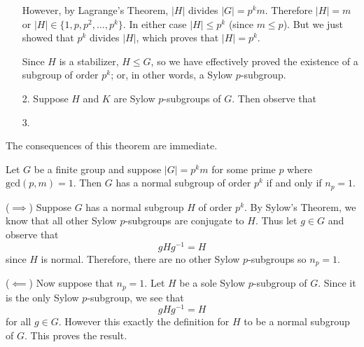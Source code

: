 \documentclass[12pt,letterpaper]{algebra_book}
\theoremstyle{definition}
\begin{document}
\begin{prf}
\begin{itemize}
            However, by Lagrange's Theorem, $|H|$ divides $|G| =
            p^km$. Therefore $|H| = m$ or $|H| \in \{1, p, p^2, \dots,
            p^k\}$. In either case $|H| \le p^k$ (since $m \le p$).
            But we just showed that $p^k$ divides $|H|$, which proves
            that $|H| = p^k$. 
            
            Since $H$ is a stabilizer, $H \le G$, so
            we have effectively proved the existence of a subgroup of
            order $p^k$; or, in other words, a Sylow $p$-subgroup. 

        \item[2.]
            Suppose $H$ and $K$ are Sylow $p$-subgroups of $G$. 
            Then observe that 

        \item[3.] 
            


            
        \end{itemize}
    \end{prf}

    The consequences of this theorem are immediate. 
    \begin{proposition}\label{sylow_normal}
        Let $G$ be a finite group and suppose $|G| = p^km$ for some
        prime $p$ where $\mbox{gcd}(p, m) = 1$. Then $G$ has a normal
        subgroup of order $p^k$ if and only if $n_p = 1$.
    \end{proposition}

    \begin{prf}
        ($\implies$) Suppose $G$ has a normal subgroup $H$ of order $p^k$. By
        Sylow's Theorem, we know that all 
        other Sylow $p$-subgroups are conjugate to $H$. Thus let $g
        \in G$ and observe that 
        \[
            gHg^{-1} = H
        \]
        since $H$ is normal. Therefore, there are no other Sylow
        $p$-subgroups so $n_p = 1.$
        
        ($\impliedby$) Now suppose that $n_p = 1$. Let $H$ be a sole
        Sylow $p$-subgroup of $G$. Since it is the only Sylow
        $p$-subgroup, we see that 
        \[
            gHg^{-1} = H
        \]
         for all $g \in G$. However this exactly the definition for
         $H$ to be a normal subgroup of $G$. This proves the result.
    \end{prf}
\end{document}
